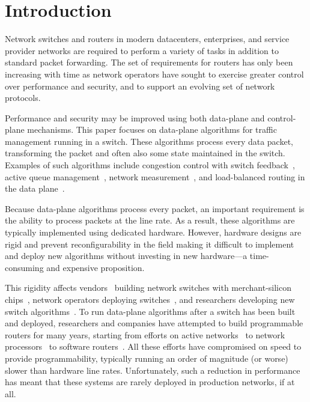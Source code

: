 \section{Introduction}
\label{s:intro}

Network switches and routers in modern datacenters, enterprises, and
service provider networks are required to perform a variety of tasks
in addition to standard packet forwarding. The set of requirements for
routers has only been increasing with time as network operators have
sought to exercise greater control over performance and security, and
to support an evolving set of network protocols.

Performance and security may be improved using both data-plane and
control-plane mechanisms. This paper focuses on data-plane algorithms
for traffic management running in a switch. These algorithms process
every data packet, transforming the packet and often also some state
maintained in the switch.  Examples of such algorithms include
congestion control with switch feedback~\cite{xcp, rcp, pdq, dctcp},
active queue management~\cite{red,blue,avq,codel,pie},
network measurement~\cite{opensketch, bitmap_george, elephant_george}, and load-balanced routing in the data
plane~\cite{conga}.

Because data-plane algorithms process every packet, an important
requirement is the ability to process packets at the line rate.  As a
result, these algorithms are typically implemented using dedicated
hardware. However, hardware designs are rigid and prevent
reconfigurability in the field making it difficult to implement and
deploy new algorithms without investing in new hardware---a
time-consuming and expensive proposition.

This rigidity affects vendors~\cite{cisco_nexus, dell_force10,
  arista_7050} building network switches with merchant-silicon
chips~\cite{trident, tomahawk, mellanox}, network operators deploying
switches~\cite{google,facebook,vl2}, and researchers developing new
switch algorithms~\cite{xcp, codel, d3, detail, pdq}.
%
To run data-plane algorithms after a switch has been built and
deployed, researchers and companies have attempted to build
programmable routers for many years, starting from efforts on active
networks~\cite{active-nets} to network processors~\cite{npu_survey} to
software routers~\cite{click,routebricks}. All these efforts have
compromised on speed to provide programmability, typically running an
order of magnitude (or worse) slower than hardware line
rates. Unfortunately, such a reduction in performance has meant that
these systems are rarely deployed in production networks, if at all.

